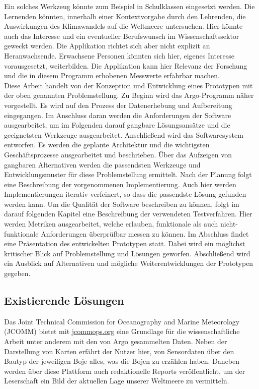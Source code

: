 Ein solches Werkzeug könnte zum Beispiel in Schulklassen eingesetzt werden.
Die Lernenden könnten, innerhalb einer Kontextvorgabe durch den Lehrenden, die Auswirkungen des Klimawandels auf die Weltmeere untersuchen.
Hier könnte auch das Interesse und ein eventueller Berufswunsch im Wissenschaftssektor geweckt werden.
Die Applikation richtet sich aber nicht explizit an Heranwachsende. Erwachsene Personen könnten sich hier, eigenes Interesse vorausgesetzt, weiterbilden. Die Applikation kann hier Relevanz der Forschung und die in diesem Programm erhobenen Messwerte erfahrbar machen. \\


Diese Arbeit handelt von der Konzeption und Entwicklung eines Prototypen mit der oben genannten Problemstellung. Zu Beginn wird das Argo-Programm näher vorgestellt. Es wird auf den Prozess der Datenerhebung und Aufbereitung eingegangen. Im Anschluss daran werden die Anforderungen der Software ausgearbeitet, um im Folgenden darauf gangbare Lösungsansätze und die geeignetsten Werkzeuge ausgearbeitet.
Anschließend wird das Softwaresystem entworfen. Es werden die geplante Architektur und die wichtigsten Geschäftsprozesse ausgearbeitet und beschrieben. Über das
Aufzeigen von gangbaren Alternativen werden die passendsten Werkzeuge und Entwicklungsmuster für diese Problemstellung ermittelt.
Nach der Planung folgt eine Beschreibung der vorgenommenen Implementierung. Auch hier werden Implementierungen iterativ verfeinert, so dass die passendste Lösung gefunden werden kann.
Um die Qualität der Software beschreiben zu können, folgt im darauf folgenden Kapitel eine Beschreibung der verwendeten Testverfahren. Hier werden Metriken ausgearbeitet, welche erlauben, funktionale als auch nicht-funktionale Anforderungen überprüfbar messen zu können.
Im Abschluss findet eine Präsentation des entwickelten Prototypen statt. Dabei wird ein möglichst kritischer Blick auf Problemstellung und Lösungen geworfen. Abschließend wird ein Ausblick auf Alternativen und mögliche Weiterentwicklungen der Prototypen gegeben.



\subsection{Existierende Lösungen}


Das Joint Technical Commission for Oceanography and Marine Meteorology (JCOMM) bietet mit
\url{jcommops.org} eine Grundlage für die wissenschaftliche Arbeit unter anderem mit den von Argo gesammelten Daten. Neben der Darstellung von Karten erfährt der Nutzer hier, von Sensordaten über den Bautyp der jeweiligen Boje alles, was die Bojen zu erzählen haben. Daneben werden über diese Plattform auch redaktionelle Reports veröffentlicht, um der Leserschaft ein Bild der aktuellen Lage unserer Weltmeere zu vermitteln.

